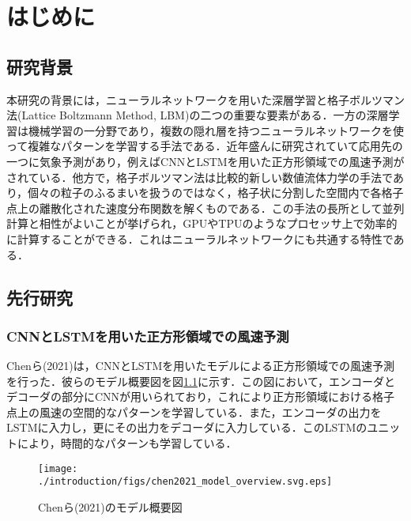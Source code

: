 \chapter{はじめに}

\section{研究背景}
本研究の背景には，ニューラルネットワークを用いた深層学習と格子ボルツマン法(Lattice Boltzmann Method, LBM)の二つの重要な要素がある．一方の深層学習は機械学習の一分野であり，複数の隠れ層を持つニューラルネットワークを使って複雑なパターンを学習する手法である\cite{doi:10.1126/science.1127647}．近年盛んに研究されていて応用先の一つに気象予測があり\cite{Schultz2021}，例えばCNNとLSTMを用いた正方形領域での風速予測がされている\cite{CHEN2021114451}．他方で，格子ボルツマン法は比較的新しい数値流体力学の手法であり，個々の粒子のふるまいを扱うのではなく，格子状に分割した空間内で各格子点上の離散化された速度分布関数を解くものである\cite{doi:10.1146/annurev.fluid.30.1.329}．この手法の長所として並列計算と相性がよいことが挙げられ，GPUやTPUのようなプロセッサ上で効率的に計算することができる\cite{Satofuka1999}．これはニューラルネットワークにも共通する特性である\cite{OH20041311}．

\section{先行研究}
\subsection{CNNとLSTMを用いた正方形領域での風速予測 \label{subsec:chen2021}}
Chenら(2021)は，CNNとLSTMを用いたモデルによる正方形領域での風速予測を行った\cite{CHEN2021114451}．彼らのモデル概要図を図\ref{fig:chen2021_architecture}に示す．この図において，エンコーダとデコーダの部分にCNNが用いられており，これにより正方形領域における格子点上の風速の空間的なパターンを学習している．また，エンコーダの出力をLSTMに入力し，更にその出力をデコーダに入力している．このLSTMのユニットにより，時間的なパターンも学習している．
\begin{figure}[btp]
    \centering
    \texttt{[image: ./introduction/figs/chen2021\_model\_overview.svg.eps]}
    \caption{Chenら(2021)のモデル概要図\cite{CHEN2021114451}}
    \label{fig:chen2021_architecture}
\end{figure}

